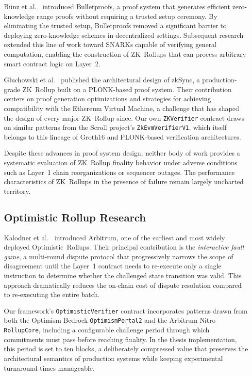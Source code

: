 B\"unz et al.~\cite{zk-efficient-proofs} introduced Bulletproofs, a proof system that generates efficient zero-knowledge range proofs without requiring a trusted setup ceremony. By eliminating the trusted setup, Bulletproofs removed a significant barrier to deploying zero-knowledge schemes in decentralized settings. Subsequent research extended this line of work toward SNARKs capable of verifying general computation, enabling the construction of ZK~Rollups that can process arbitrary smart contract logic on Layer~2.

Gluchowski et al.~\cite{zksync-paper} published the architectural design of zkSync, a production-grade ZK~Rollup built on a PLONK-based proof system. Their contribution centers on proof generation optimizations and strategies for achieving compatibility with the Ethereum Virtual Machine, a challenge that has shaped the design of every major ZK~Rollup since. Our own \texttt{ZKVerifier} contract draws on similar patterns from the Scroll project's \texttt{ZkEvmVerifierV1}, which itself belongs to this lineage of Groth16 and PLONK-based verification architectures.

Despite these advances in proof system design, neither body of work provides a systematic evaluation of ZK~Rollup finality behavior under adverse conditions such as Layer~1 chain reorganizations or sequencer outages. The performance characteristics of ZK~Rollups in the presence of failure remain largely uncharted territory.

\subsection{Optimistic Rollup Research}

Kalodner et al.~\cite{arbitrum-original} introduced Arbitrum, one of the earliest and most widely deployed Optimistic~Rollups. Their principal contribution is the \textit{interactive fault game}, a multi-round dispute protocol that progressively narrows the scope of disagreement until the Layer~1 contract needs to re-execute only a single instruction to determine whether the challenged state transition was valid. This approach dramatically reduces the on-chain cost of dispute resolution compared to re-executing the entire batch.

Our framework's \texttt{OptimisticVerifier} contract incorporates patterns drawn from both the Optimism Bedrock \texttt{OptimismPortal2} and the Arbitrum Nitro \texttt{RollupCore}, including a configurable challenge period through which commitments must pass before reaching finality. In the thesis implementation, this period is set to ten blocks, a deliberately compressed value that preserves the architectural semantics of production systems while keeping experimental turnaround times manageable.

